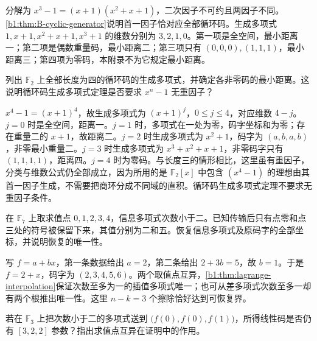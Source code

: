 \begin{solution}
	分解为 \(x^3-1=(x+1)(x^2+x+1)\)，二次因子不可约且两因子不同。\cref{b1:thm:B-cyclic-generator}说明首一因子恰对应全部循环码。生成多项式 \(1,x+1,x^2+x+1,x^3+1\) 的维数分别为 \(3,2,1,0\)。第一项是全空间，最小距离一；第二项是偶数重量码，最小距离二；第三项只有 \((0,0,0),(1,1,1)\)，最小距离三；第四项为零码，本附录不为它规定最小距离。
\end{solution}

\begin{exercise}\label{b1:ex:B-repeated-cyclic}
	列出 \(\mathbb F_2\) 上全部长度为四的循环码的生成多项式，并确定各非零码的最小距离。这说明循环码生成多项式定理是否要求 \(x^n-1\) 无重因子？
\end{exercise}

\begin{solution}
	\(x^4-1=(x+1)^4\)，故生成多项式为 \((x+1)^j\)，\(0\leq j\leq4\)，对应维数 \(4-j\)。\(j=0\) 时是全空间，距离一。\(j=1\) 时，多项式在一处为零，码字坐标和为零；存在重量二的 \(x+1\)，故距离二。\(j=2\) 时生成多项式为 \(x^2+1\)，码字为 \((a,b,a,b)\)，非零最小重量二。\(j=3\) 时生成多项式为 \(x^3+x^2+x+1\)，非零码字只有 \((1,1,1,1)\)，距离四。\(j=4\) 时为零码。与长度三的情形相比，这里虽有重因子，分类与维数公式仍全部成立，因为所用的是 \(\mathbb F_2[x]\) 中包含 \((x^4-1)\) 的理想由其首一因子生成，不需要把商环分成不同域的直积。循环码生成多项式定理不要求无重因子条件。
\end{solution}

\begin{exercise}\label{b1:ex:B-rs-erasures}
	在 \(\mathbb F_7\) 上取求值点 \(0,1,2,3,4\)，信息多项式次数小于二。已知传输后只有点零和点三处的符号被保留下来，其值分别为二和五。恢复信息多项式及原码字的全部坐标，并说明恢复的唯一性。
\end{exercise}

\begin{solution}
	写 \(f=a+bx\)，第一条数据给出 \(a=2\)，第二条给出 \(2+3b=5\)，故 \(b=1\)。于是 \(f=2+x\)，码字为 \((2,3,4,5,6)\)。两个取值点互异，\cref{b1:thm:lagrange-interpolation}保证次数至多为一的插值多项式唯一；也可从差多项式次数至多一却有两个根推出唯一性。这里 \(n-k=3\) 个擦除恰好达到可恢复界。
\end{solution}

\begin{exercise}\label{b1:ex:B-rs-distinct-points}
	若在 \(\mathbb F_3\) 上把次数小于二的多项式送到 \(\bigl(f(0),f(0),f(1)\bigr)\)，所得线性码是否仍有 \([3,2,2]\) 参数？指出求值点互异在证明中的作用。
\end{exercise}

